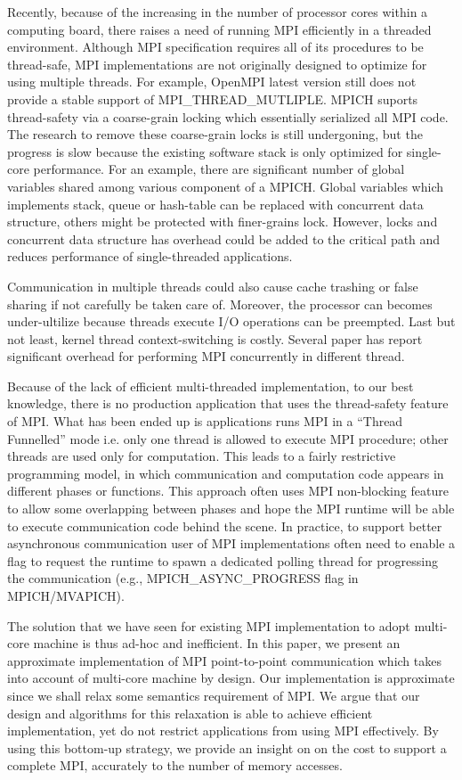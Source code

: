 \documentclass{sig-alternate-05-2015}
\begin{document}
Recently, because of the increasing in the number of processor cores within a
computing board, there raises a need of running MPI efficiently in a threaded
environment.  Although MPI specification requires all of its procedures to be
thread-safe, MPI implementations are not originally designed to optimize for
using multiple threads. For example, OpenMPI latest version still does not
provide a stable support of MPI\_THREAD\_MUTLIPLE.  MPICH suports thread-safety
via a coarse-grain locking which essentially serialized all MPI code. The
research to remove these coarse-grain locks is still undergoning, but the
progress is slow because the existing software stack is only optimized for
single-core performance. For an example, there are significant number of global
variables shared among various component of a MPICH. Global variables which
implements stack, queue or hash-table can be replaced with concurrent data
structure, others might be protected with finer-grains lock.  However, locks
and concurrent data structure has overhead could be added to  the critical path
and reduces performance of single-threaded applications.

Communication in multiple threads could also cause cache trashing or false
sharing if not carefully be taken care of. Moreover, the processor can becomes
under-ultilize because threads execute I/O operations can be preempted. Last but
not least, kernel thread context-switching is costly. Several paper has report
significant overhead for performing MPI concurrently in different thread.

Because of the lack of efficient multi-threaded implementation, to our best
knowledge, there is no production application that uses the thread-safety
feature of MPI. What has been ended up is applications runs MPI in a ``Thread
Funnelled'' mode i.e. only one thread is allowed to execute MPI procedure;
other threads are used only for computation. This leads to a fairly restrictive
programming model, in which communication and computation code appears in
different phases or functions. This approach often uses MPI non-blocking
feature to allow some overlapping between phases and hope the MPI runtime will
be able to execute communication code behind the scene. In practice, to support
better asynchronous communication user of MPI implementations often need to
enable a flag to request the runtime to spawn a dedicated polling thread for
progressing the communication (e.g., MPICH_ASYNC_PROGRESS flag in
MPICH/MVAPICH).

The solution that we have seen for existing MPI implementation to adopt
multi-core machine is thus ad-hoc and inefficient. In this
paper, we present an approximate implementation of MPI point-to-point
communication which takes into account of multi-core machine by design. Our
implementation is approximate since we shall relax some semantics requirement
of MPI. We argue that our design and algorithms for this relaxation is able to
achieve efficient implementation, yet do not restrict applications from using
MPI effectively. By using this bottom-up strategy, we provide an insight on 
on the cost to support a complete MPI, accurately to the number of memory
accesses.
\end{document}
